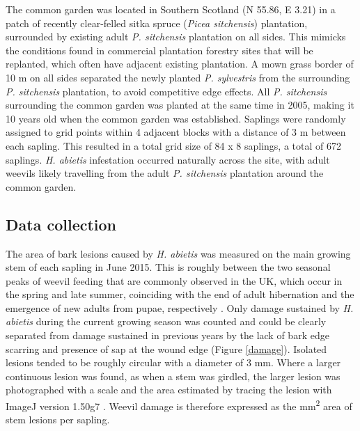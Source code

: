 \documentclass[a4paper, 11pt]{article}
\newcommand{\textapprox}{\raisebox{0.5ex}{\texttildelow}}
\newcommand{\todo}[1]{\textcolor{red}{#1}}   %
\begin{document}
The common garden was located in Southern Scotland (N 55.86\textdegree{}, E \textminus{}3.21\textdegree{}) in a patch of recently clear-felled sitka spruce (\textit{Picea sitchensis}) plantation, surrounded by existing adult \textit{P. sitchensis} plantation on all sides. This mimicks the conditions found in commercial plantation forestry sites that will be replanted, which often have adjacent existing plantation. A mown grass border of 10 m on all sides separated the newly planted \textit{P. sylvestris} from the surrounding \textit{P. sitchensis} plantation, to avoid competitive edge effects. All \textit{P. sitchensis} surrounding the common garden was planted at the same time in 2005, making it 10 years old when the common garden was established. %
Saplings were randomly assigned to grid points within 4 adjacent blocks with a distance of 3 m between each sapling. This resulted in a total grid size of 84 x 8 saplings, a total of 672 saplings. \textit{H. abietis} infestation occurred naturally across the site, with adult weevils likely travelling from the adult \textit{P. sitchensis} plantation around the common garden. 

\subsection*{Data collection}

The area of bark lesions caused by \textit{H. abietis} was measured on the main growing stem of each sapling in June 2015. This is roughly between the two seasonal peaks of weevil feeding that are commonly observed in the UK, which occur in the spring and late summer, coinciding with the end of adult hibernation and the emergence of new adults from pupae, respectively \citep{Nordenhem1989, Leather1999}. Only damage sustained by \textit{H. abietis} during the current growing season was counted and could be clearly separated from damage sustained in previous years by the lack of bark edge scarring and presence of sap at the wound edge (Figure \ref{damage}). Isolated lesions tended to be roughly circular with a diameter of \textapprox{}3 mm. Where a larger continuous lesion was found, as when a stem was girdled, the larger lesion was photographed with a scale and the area estimated by tracing the lesion with ImageJ version 1.50g7 \citep{Schneider2012}. Weevil damage is therefore expressed as the mm\textsuperscript{2} area of stem lesions per sapling. 
\end{document}
